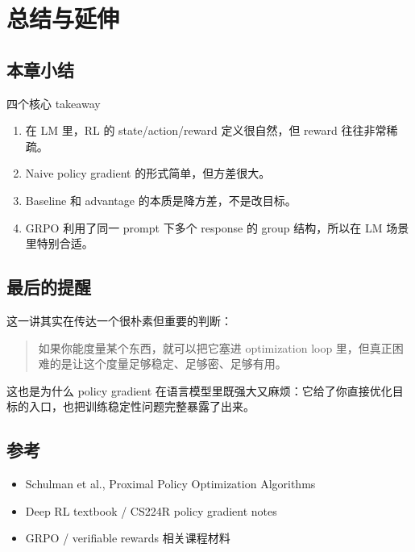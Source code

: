 \section{总结与延伸}

\subsection{本章小结}

\begin{importantbox}{四个核心 takeaway}
\begin{enumerate}
    \item 在 LM 里，RL 的 state/action/reward 定义很自然，但 reward 往往非常稀疏。
    \item Naive policy gradient 的形式简单，但方差很大。
    \item Baseline 和 advantage 的本质是降方差，不是改目标。
    \item GRPO 利用了同一 prompt 下多个 response 的 group 结构，所以在 LM 场景里特别合适。
\end{enumerate}
\end{importantbox}


\subsection{最后的提醒}

这一讲其实在传达一个很朴素但重要的判断：
\begin{quote}
如果你能度量某个东西，就可以把它塞进 optimization loop 里，但真正困难的是让这个度量足够稳定、足够密、足够有用。
\end{quote}

这也是为什么 policy gradient 在语言模型里既强大又麻烦：它给了你直接优化目标的入口，也把训练稳定性问题完整暴露了出来。

\subsection{参考}

\begin{itemize}
    \item Schulman et al., Proximal Policy Optimization Algorithms
    \item Deep RL textbook / CS224R policy gradient notes
    \item GRPO / verifiable rewards 相关课程材料
\end{itemize}


